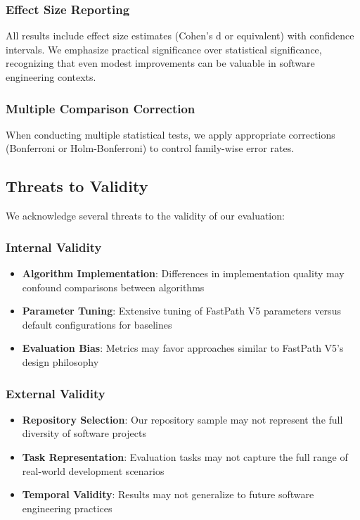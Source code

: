 \documentclass[conference]{IEEEtran}
\begin{document}
\subsubsection{Effect Size Reporting}
All results include effect size estimates (Cohen's d or equivalent) with confidence intervals. We emphasize practical significance over statistical significance, recognizing that even modest improvements can be valuable in software engineering contexts.

\subsubsection{Multiple Comparison Correction}
When conducting multiple statistical tests, we apply appropriate corrections (Bonferroni or Holm-Bonferroni) to control family-wise error rates.

\subsection{Threats to Validity}

We acknowledge several threats to the validity of our evaluation:

\subsubsection{Internal Validity}
\begin{itemize}
\item \textbf{Algorithm Implementation}: Differences in implementation quality may confound comparisons between algorithms
\item \textbf{Parameter Tuning}: Extensive tuning of FastPath V5 parameters versus default configurations for baselines
\item \textbf{Evaluation Bias}: Metrics may favor approaches similar to FastPath V5's design philosophy
\end{itemize}

\subsubsection{External Validity}
\begin{itemize}
\item \textbf{Repository Selection}: Our repository sample may not represent the full diversity of software projects
\item \textbf{Task Representation}: Evaluation tasks may not capture the full range of real-world development scenarios
\item \textbf{Temporal Validity}: Results may not generalize to future software engineering practices
\end{itemize}
\end{document}
